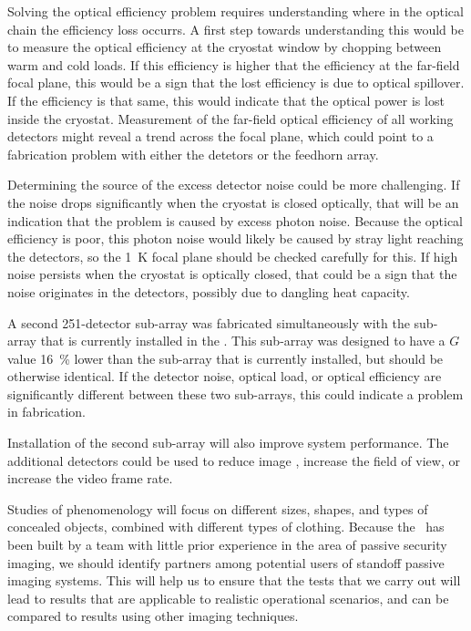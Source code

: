Solving the optical efficiency problem requires understanding where in the optical chain the efficiency loss occurrs.
A first step towards understanding this would be to measure the optical efficiency at the cryostat window by chopping between warm and cold loads.
If this efficiency is higher that the efficiency at the far-field focal plane, this would be a sign that the lost efficiency is due to optical spillover.
If the efficiency is that same, this would indicate that the optical power is lost inside the cryostat.
Measurement of the far-field optical efficiency of all working detectors might reveal a trend across the focal plane, which could point to a fabrication problem with either the detetors or the feedhorn array.

Determining the source of the excess detector noise could be more challenging.
If the noise drops significantly when the cryostat is closed optically, that will be an indication that the problem is caused by excess photon noise.
Because the optical efficiency is poor, this photon noise would likely be caused by stray light reaching the detectors, so the \SI{1}{\K} focal plane should be checked carefully for this.
If high noise persists when the cryostat is optically closed, that could be a sign that the noise originates in the detectors, possibly due to dangling heat capacity.

A second 251-detector sub-array was fabricated simultaneously with the sub-array that is currently installed in the \Imager.
This sub-array was designed to have a $G$ value \SI{16}{\percent} lower than the sub-array that is currently installed, but should be otherwise identical.
If the detector noise, optical load, or optical efficiency are significantly different between these two sub-arrays, this could indicate a problem in fabrication.


Installation of the second sub-array will also improve system performance.
The additional detectors could be used to reduce image \NETD, increase the field of view, or increase the video frame rate.

Studies of phenomenology will focus on different sizes, shapes, and types of concealed objects, combined with different types of clothing.
Because the \Imager\ has been built by a team with little prior experience in the area of passive security imaging, we should identify partners among potential users of standoff passive imaging systems.
This will help us to ensure that the tests that we carry out will lead to results that are applicable to realistic operational scenarios, and can be compared to results using other imaging techniques.

